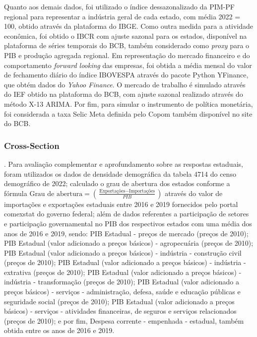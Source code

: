 Quanto aos demais dados, foi utilizado o índice dessazonalizado da \gls{PIM-PF} regional para representar a indústria geral de cada estado, com média 2022 = 100, obtido através da plataforma do \gls{IBGE}. Como outra medida para a atividade econômica, foi obtido o \gls{IBCR} com ajuste sazonal para os estados, disponível na plataforma de séries temporais do \gls{BCB}, também considerado como \textit{proxy} para o \gls{PIB} e produção agregada regional. Em representação do mercado financeiro e do comportamento \textit{forward looking} das empresas, foi obtida a média mensal do valor de fechamento diário do índice IBOVESPA através do pacote Python YFinance, que obtém dados do \textit{Yahoo Finance}. O mercado de trabalho é simulado através do \gls{IEF} obtido na plataforma do \gls{BCB}, com ajuste sazonal realizado através do método X-13 ARIMA. Por fim, para simular o instrumento de política monetária, foi considerada a taxa \gls{Selic} Meta definida pelo \gls{Copom} também disponível no site do \gls{BCB}.
\par

\subsubsection{Cross-Section}. Para avaliação complementar e aprofundamento sobre as respostas estaduais, foram utilizados os dados de densidade demográfica da tabela 4714 do censo demográfico de 2022; calculado o grau de abertura dos estados conforme a fórmula $\text{Grau de abertura} =(\frac{\text{Exportações} -\text{Importações}}{PIB})$ através do valor de importações e exportações estaduais entre 2016 e 2019 fornecidos pelo portal comexstat do governo federal; além de dados referentes a participação de setores e participação governamental no \gls{PIB} dos respectivos estados com uma média dos anos de 2016 e 2019, sendo:  
\gls{PIB} Estadual - preços de mercado (preços de 2010);
\gls{PIB} Estadual (valor adicionado a preços básicos) - agropecuária (preços de 2010);
\gls{PIB} Estadual (valor adicionado a preços básicos) - indústria - construção civil (preços de 2010);
\gls{PIB} Estadual (valor adicionado a preços básicos) - indústria - extrativa (preços de 2010);
\gls{PIB} Estadual (valor adicionado a preços básicos) - indústria - transformação (preços de 2010);
\gls{PIB} Estadual (valor adicionado a preços básicos) - serviços - administração, defesa, saúde e educação públicas e seguridade social (preços de 2010);
\gls{PIB} Estadual (valor adicionado a preços básicos) - serviços - atividades financeiras, de seguros e serviços relacionados (preços de 2010); e por fim, Despesa corrente - empenhada - estadual, também obtida entre os anos de 2016 e 2019.

